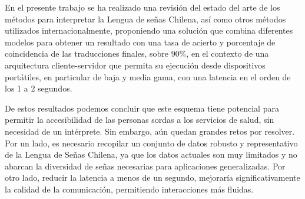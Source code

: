 \documentclass{article}
\begin{document}
En el presente trabajo se ha realizado una revisión del estado del arte de los métodos para interpretar la Lengua de señas Chilena, así como otros métodos utilizados internacionalmente, proponiendo una solución que combina diferentes modelos para obtener un resultado con una tasa de acierto y porcentaje de coincidencia de las traducciones finales, sobre 90\%, en el contexto de una arquitectura cliente-servidor que permita su ejecución desde dispositivos portátiles, en particular de baja y media gama, con una latencia en el orden de los 1 a 2 segundos.


De estos resultados podemos concluir que este esquema tiene potencial para permitir la accesibilidad de las personas sordas a los servicios de salud, sin necesidad de un intérprete. Sin embargo, aún quedan grandes retos por resolver. Por un lado, es necesario recopilar un conjunto de datos robusto y representativo de la Lengua de Señas Chilena, ya que los datos actuales son muy limitados y no abarcan la diversidad de señas necesarias para aplicaciones generalizadas. Por otro lado, reducir la latencia a menos de un segundo, mejoraría significativamente la calidad de la comunicación, permitiendo interacciones más fluidas.
\end{document}
